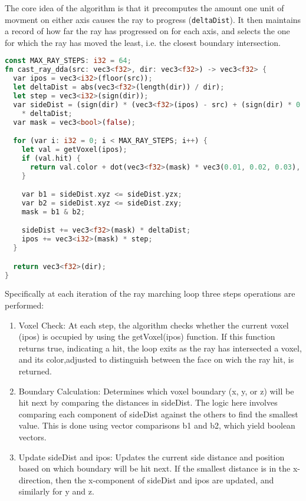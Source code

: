 The core idea of the algorithm is that it precomputes the amount one unit of movment on either axis causes the ray to progress (\texttt{deltaDist}). It then maintains a record of how far the ray has progressed on for each axis, and selects the one for which the ray has moved the least, i.e. the closest boundary intersection.

\begin{lstlisting}[language=rust, captionpos=b, caption={\texttt{DDA} algorithm}]
const MAX_RAY_STEPS: i32 = 64;
fn cast_ray_dda(src: vec3<f32>, dir: vec3<f32>) -> vec3<f32> {
  var ipos = vec3<i32>(floor(src));
  let deltaDist = abs(vec3<f32>(length(dir)) / dir);
  let step = vec3<i32>(sign(dir));
  var sideDist = (sign(dir) * (vec3<f32>(ipos) - src) + (sign(dir) * 0.5) + 0.5)
    * deltaDist;
  var mask = vec3<bool>(false);

  for (var i: i32 = 0; i < MAX_RAY_STEPS; i++) {
    let val = getVoxel(ipos);
    if (val.hit) {
      return val.color + dot(vec3<f32>(mask) * vec3(0.01, 0.02, 0.03), vec3(1.0));
    }

    var b1 = sideDist.xyz <= sideDist.yzx;
    var b2 = sideDist.xyz <= sideDist.zxy;
    mask = b1 & b2;

    sideDist += vec3<f32>(mask) * deltaDist;
    ipos += vec3<i32>(mask) * step;
  }

  return vec3<f32>(dir);
}
\end{lstlisting}

Specifically at each iteration of the ray marching loop three steps operations are performed:
\begin{enumerate}
  \item Voxel Check: At each step, the algorithm checks whether the current voxel (ipos) is occupied by using the getVoxel(ipos) function. If this function returns true, indicating a hit, the loop exits as the ray has intersected a voxel, and its color,adjusted to distinguish between the face on wich the ray hit, is returned.
  \item Boundary Calculation: Determines which voxel boundary (x, y, or z) will be hit next by comparing the distances in sideDist. The logic here involves comparing each component of sideDist against the others to find the smallest value. This is done using vector comparisons b1 and b2, which yield boolean vectors.
  \item Update sideDist and ipos: Updates the current side distance and position based on which boundary will be hit next. If the smallest distance is in the x-direction, then the x-component of sideDist and ipos are updated, and similarly for y and z.
\end{enumerate}

